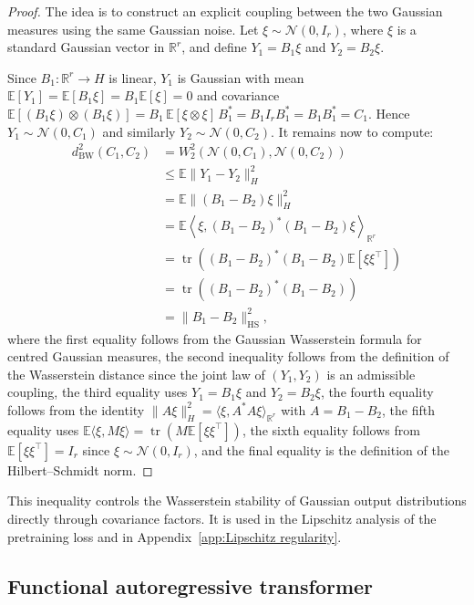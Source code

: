 \begin{proof}
The idea is to construct an explicit coupling between the two Gaussian measures using the same Gaussian noise. Let \(\xi\sim\mathcal N(0,I_r)\), where \(\xi\) is a standard Gaussian vector in \(\mathbb R^r\), and define \(Y_1=B_1\xi\) and \(Y_2=B_2\xi\).

Since \(B_1:\mathbb R^r\to H\) is linear, \(Y_1\) is Gaussian with mean \(\mathbb E[Y_1]=\mathbb E[B_1\xi]=B_1\mathbb E[\xi]=0\) and covariance \(\mathbb E[(B_1\xi)\otimes(B_1\xi)] = B_1\,\mathbb E[\xi\otimes\xi]\,B_1^* =B_1I_rB_1^* = B_1B_1^* = C_1 \).
Hence \(Y_1\sim\mathcal N(0,C_1)\) and similarly \(Y_2\sim\mathcal N(0,C_2)\). It remains now to compute:
\[
\begin{aligned}
d_{\mathrm{BW}}^2(C_1,C_2) &=W_2^2\!\left(\mathcal N(0,C_1),\mathcal N(0,C_2)\right) \\
&\leqslant\mathbb E\lVert Y_1-Y_2\rVert_H^2 \\
&=
\mathbb E\lVert(B_1-B_2)\xi\rVert_H^2 \\
&=
\mathbb E\left\langle
\xi,(B_1-B_2)^*(B_1-B_2)\xi
\right\rangle_{\mathbb R^r}\\
&=
\operatorname{tr}\left(
(B_1-B_2)^*(B_1-B_2)\mathbb E[\xi\xi^\top]
\right)\\
&=
\operatorname{tr}\left(
(B_1-B_2)^*(B_1-B_2)
\right)\\
&=
\lVert B_1-B_2\rVert_{\mathrm{HS}}^2,
\end{aligned}
\]
where the first equality follows from the Gaussian Wasserstein formula for centred Gaussian measures, the second inequality follows from the definition of the Wasserstein distance since the joint law of \((Y_1,Y_2)\) is an admissible coupling, the third equality uses \(Y_1=B_1\xi\) and \(Y_2=B_2\xi\), the fourth equality follows from the identity \(\|A\xi\|_H^2=\langle \xi,A^*A\xi\rangle_{\mathbb R^r}\) with \(A=B_1-B_2\), the fifth equality uses \(\mathbb E\langle \xi,M\xi\rangle=\operatorname{tr}(M\mathbb E[\xi\xi^\top])\), the sixth equality follows from \(\mathbb E[\xi\xi^\top]=I_r\) since \(\xi\sim\mathcal N(0,I_r)\), and the final equality is the definition of the Hilbert--Schmidt norm.
\end{proof}

This inequality controls the Wasserstein stability of Gaussian output distributions directly through covariance factors. It is used in the Lipschitz analysis of the pretraining loss and in Appendix~\ref{app:Lipschitz regularity}.


\subsection{Functional autoregressive transformer}
\label{subsec:Functional autoregressive transformer}

